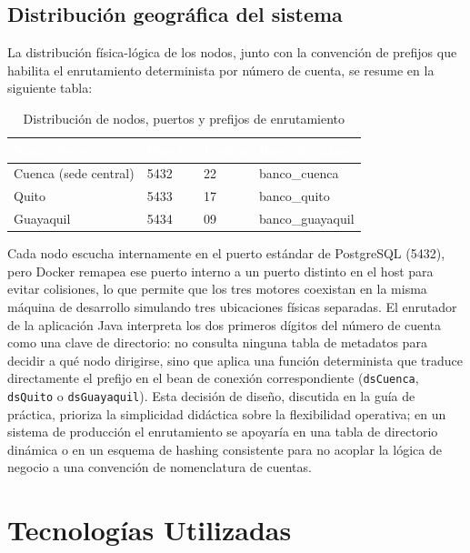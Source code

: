 \documentclass[11pt,a4paper]{article}
\begin{document}
\subsection{Distribución geográfica del sistema}

La distribución física-lógica de los nodos, junto con la convención de prefijos que habilita el enrutamiento determinista por número de cuenta, se resume en la siguiente tabla:

\begin{table}[h!]
\centering
\begin{tabular}{@{}p{3.5cm}p{2.2cm}p{2.5cm}p{2.5cm}@{}}
\toprule
\rowcolor{primario!90}
\textcolor{white}{\textbf{Nodo (Sede)}} & \textcolor{white}{\textbf{Puerto}} & \textcolor{white}{\textbf{Prefijo}} & \textcolor{white}{\textbf{Base de datos}} \\
\midrule
Cuenca (sede central) & 5432 & 22 & banco\_cuenca \\
Quito & 5433 & 17 & banco\_quito \\
Guayaquil & 5434 & 09 & banco\_guayaquil \\
\bottomrule
\end{tabular}
\caption{Distribución de nodos, puertos y prefijos de enrutamiento}
\end{table}

Cada nodo escucha internamente en el puerto estándar de PostgreSQL (5432), pero Docker remapea ese puerto interno a un puerto distinto en el host para evitar colisiones, lo que permite que los tres motores coexistan en la misma máquina de desarrollo simulando tres ubicaciones físicas separadas. El enrutador de la aplicación Java interpreta los dos primeros dígitos del número de cuenta como una clave de directorio: no consulta ninguna tabla de metadatos para decidir a qué nodo dirigirse, sino que aplica una función determinista que traduce directamente el prefijo en el bean de conexión correspondiente (\texttt{dsCuenca}, \texttt{dsQuito} o \texttt{dsGuayaquil}). Esta decisión de diseño, discutida en la guía de práctica, prioriza la simplicidad didáctica sobre la flexibilidad operativa; en un sistema de producción el enrutamiento se apoyaría en una tabla de directorio dinámica o en un esquema de hashing consistente para no acoplar la lógica de negocio a una convención de nomenclatura de cuentas.

\section{Tecnologías Utilizadas}
\end{document}
